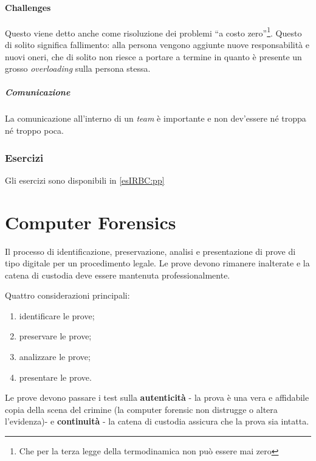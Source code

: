 \subsubsection{Challenges}

Questo viene detto anche come risoluzione dei problemi ``a costo
zero''\footnote{Che per la terza legge della termodinamica non può essere mai
zero}. Questo di solito significa fallimento: alla persona vengono aggiunte
nuove responsabilità e nuovi oneri, che di solito non riesce a portare a termine
in quanto è presente un grosso \textit{overloading} sulla persona stessa.

\paragraph*{Comunicazione} La comunicazione all'interno di un \textit{team} è
importante e non dev'essere né troppa né troppo poca.

\subsection{Esercizi}

Gli esercizi sono disponibili in \ref{esIRBC:pp}

\chapter{Computer Forensics}
\label{IRBC:cf}

Il processo di identificazione, preservazione, analisi e presentazione di prove
di tipo digitale per un procedimento legale. Le prove devono rimanere inalterate
e la catena di custodia deve essere mantenuta professionalmente.

Quattro considerazioni principali:

\begin{enumerate}
\item identificare le prove;
\item preservare le prove;
\item analizzare le prove;
\item presentare le prove.
\end{enumerate}

Le prove devono passare i test sulla \textbf{autenticità} - la prova è una vera
e affidabile copia della scena del crimine (la computer forensic non distrugge
o altera l'evidenza)- e \textbf{continuità} - la catena di custodia assicura
che la prova sia intatta.

